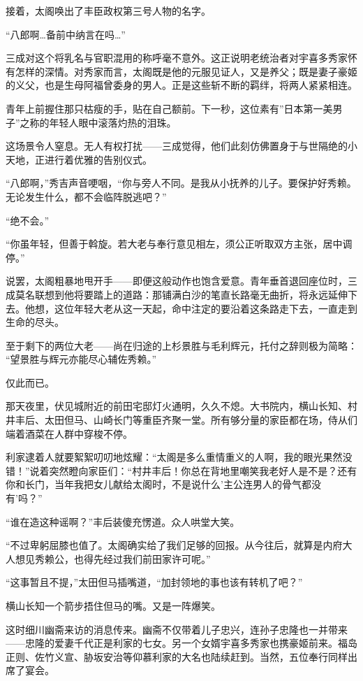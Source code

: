 \documentclass[
]{book}
\begin{document}
接着，太阁唤出了丰臣政权第三号人物的名字。

``八郎啊\ldots 备前中纳言在吗\ldots{}''

三成对这个将乳名与官职混用的称呼毫不意外。这正说明老统治者对宇喜多秀家怀有怎样的深情。对秀家而言，太阁既是他的元服见证人，又是养父；既是妻子豪姬的义父，也是生母阿福曾委身的男人。正是这些斩不断的羁绊，将两人紧紧相连。

青年上前握住那只枯瘦的手，贴在自己额前。下一秒，这位素有''日本第一美男子''之称的年轻人眼中滚落灼热的泪珠。

这场景令人窒息。无人有权打扰------三成觉得，他们此刻仿佛置身于与世隔绝的小天地，正进行着优雅的告别仪式。

``八郎啊，''秀吉声音哽咽，``你与旁人不同。是我从小抚养的儿子。要保护好秀赖。无论发生什么，都不会临阵脱逃吧？''

``绝不会。''

``你虽年轻，但善于斡旋。若大老与奉行意见相左，须公正听取双方主张，居中调停。''

说罢，太阁粗暴地甩开手------即便这般动作也饱含爱意。青年垂首退回座位时，三成莫名联想到他将要踏上的道路：那铺满白沙的笔直长路毫无曲折，将永远延伸下去。他想，这位年轻大老从这一天起，命中注定的要沿着这条路走下去，一直走到生命的尽头。

至于剩下的两位大老------尚在归途的上杉景胜与毛利辉元，托付之辞则极为简略：
``望景胜与辉元亦能尽心辅佐秀赖。''

仅此而已。

那天夜里，伏见城附近的前田宅邸灯火通明，久久不熄。大书院内，横山长知、村井丰后、太田但马、山崎长门等重臣齐聚一堂。所有够分量的家臣都在场，侍从们端着酒菜在人群中穿梭不停。

利家逮着人就要絮絮叨叨地炫耀：``太阁是多么重情重义的人啊，我的眼光果然没错！''说着突然瞪向家臣们：``村井丰后！你总在背地里嘲笑我老好人是不是？还有你和长门，当年我把女儿献给太阁时，不是说什么'主公连男人的骨气都没有'吗？''

``谁在造这种谣啊？''丰后装傻充愣道。众人哄堂大笑。

``不过卑躬屈膝也值了。太阁确实给了我们足够的回报。从今往后，就算是内府大人想见秀赖公，也得先经过我们前田家许可呢。''

``这事暂且不提，''太田但马插嘴道，``加封领地的事也该有转机了吧？''

横山长知一个箭步捂住但马的嘴。又是一阵爆笑。

这时细川幽斋来访的消息传来。幽斋不仅带着儿子忠兴，连孙子忠隆也一并带来------忠隆的爱妻千代正是利家的七女。另一个女婿宇喜多秀家也携豪姬前来。福岛正则、佐竹义宣、胁坂安治等仰慕利家的大名也陆续赶到。当然，五位奉行同样出席了宴会。
\end{document}
